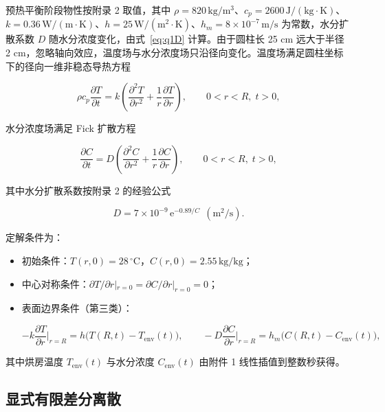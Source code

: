 \documentclass[withoutpreface,bwprint]{cumcmthesis} %
\begin{document}
预热平衡阶段物性按附录 2 取值，其中 $\rho=820\,\mathrm{kg/m^3}$、$c_p=2600\,\mathrm{J/(kg\cdot K)}$、$k=0.36\,\mathrm{W/(m\cdot K)}$、$h=25\,\mathrm{W/(m^2\cdot K)}$、$h_m=8\times10^{-7}\,\mathrm{m/s}$ 为常数，水分扩散系数 $D$ 随水分浓度变化，由式~\eqref{eq:q1D} 计算。由于圆柱长 25 cm 远大于半径 2 cm，忽略轴向效应，温度场与水分浓度场只沿径向变化。温度场满足圆柱坐标下的径向一维非稳态导热方程

\begin{equation}
\rho c_p\frac{\partial T}{\partial t}
= k\left(\frac{\partial^2 T}{\partial r^2}+\frac{1}{r}\frac{\partial T}{\partial r}\right),
\qquad 0<r<R,\; t>0,
\label{eq:q1T}
\end{equation}

水分浓度场满足 Fick 扩散方程

\begin{equation}
\frac{\partial C}{\partial t}
= D\left(\frac{\partial^2 C}{\partial r^2}+\frac{1}{r}\frac{\partial C}{\partial r}\right),
\qquad 0<r<R,\; t>0,
\label{eq:q1C}
\end{equation}

其中水分扩散系数按附录 2 的经验公式

\begin{equation}
D = 7\times10^{-9}\,\mathrm{e}^{-0.89/C}\ \ \mathrm{(m^2/s)}.
\label{eq:q1D}
\end{equation}

定解条件为：

\begin{itemize}
\item 初始条件：$T(r,0)=28\,{}^\circ$C，$C(r,0)=2.55\,\mathrm{kg/kg}$；
\item 中心对称条件：$\partial T/\partial r|_{r=0}=\partial C/\partial r|_{r=0}=0$；
\item 表面边界条件（第三类）：

\begin{equation}
-k\frac{\partial T}{\partial r}\Big|_{r=R}=h\bigl(T(R,t)-T_{\mathrm{env}}(t)\bigr),
\qquad
-D\frac{\partial C}{\partial r}\Big|_{r=R}=h_m\bigl(C(R,t)-C_{\mathrm{env}}(t)\bigr),
\label{eq:q1bc}
\end{equation}
\end{itemize}

其中烘房温度 $T_{\mathrm{env}}(t)$ 与水分浓度 $C_{\mathrm{env}}(t)$ 由附件 1 线性插值到整数秒获得。

\subsection{显式有限差分离散}
\end{document}
